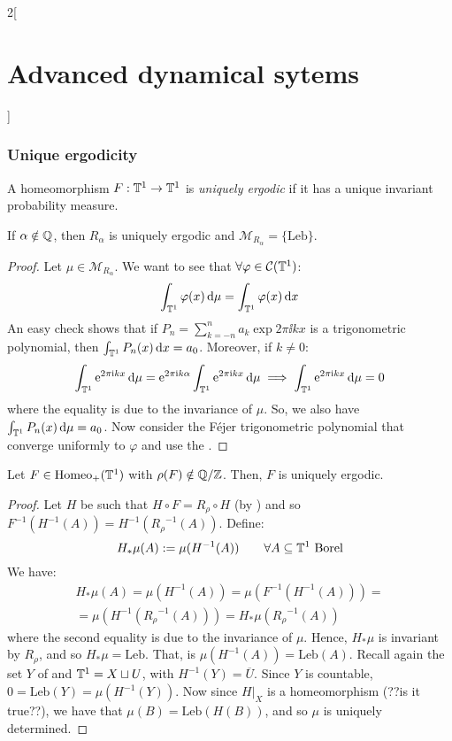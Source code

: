 \documentclass[../../../main_math.tex]{subfiles}
\begin{document}
\begin{multicols}{2}[\section{Advanced dynamical sytems}]
  \subsubsection{Unique ergodicity}
  \begin{definition}
    A homeomorphism $F:\mathbb{T}^1\to\mathbb{T}^1$ is \emph{uniquely ergodic} if it has a unique invariant probability measure.
  \end{definition}
  \begin{lemma}
    If $\alpha\notin \mathbb{Q}$, then $R_\alpha$ is uniquely ergodic and $\mathcal{M}_{R_\alpha}=\{\text{Leb}\}$.
  \end{lemma}
  \begin{proof}
    Let $\mu\in\mathcal{M}_{R_\alpha}$. We want to see that $\forall \varphi\in \mathcal{C}(\mathbb{T}^1)$:
    $$
      \int_{\mathbb{T}^1}\varphi(x)\dd{\mu}=\int_{\mathbb{T}^1}\varphi(x)\dd{x}
    $$
    An easy check shows that if $P_n=\sum_{k=-n}^na_k\exp{2\pi\ii k x}$ is a trigonometric polynomial, then $\int_{\mathbb{T}^1}P_n(x)\dd{x}=a_0$. Moreover, if $k\ne 0$:
    $$
      \int_{\mathbb{T}^1}\mathrm{e}^{2\pi\mathrm{i} kx}\dd{\mu}=\mathrm{e}^{2\pi\mathrm{i} k\alpha}\int_{\mathbb{T}^1}\mathrm{e}^{2\pi\mathrm{i} kx}\dd{\mu}\implies \int_{\mathbb{T}^1}\mathrm{e}^{2\pi\mathrm{i} kx}\dd{\mu}=0
    $$
    where the equality is due to the invariance of $\mu$. So, we also have $\int_{\mathbb{T}^1}P_n(x)\dd{\mu}=a_0$. Now consider the Féjer trigonometric polynomial that converge uniformly to $\varphi$ and use the .
  \end{proof}
  \begin{proposition}\label{ADS:uniquely_ergodic}
    Let $F\in\mathrm{Homeo}_+(\mathbb{T}^1)$ with $\rho(F)\notin\quot{\QQ}{\ZZ}$. Then, $F$ is uniquely ergodic.
  \end{proposition}
  \begin{proof}
    Let $H$ be such that $H\circ F=R_\rho\circ H$ (by ) and so $F^{-1}(H^{-1}(A))=H^{-1}({R_\rho}^{-1}(A))$. Define:
    $$
      H_*\mu(A):=\mu(H^{-1}(A))\qquad \forall A\subseteq \mathbb{T}^1\text{ Borel}
    $$
    We have:
    \begin{multline*}
      H_*\mu(A)=\mu(H^{-1}(A))=\mu(F^{-1}(H^{-1}(A)))=\\=\mu(H^{-1}({R_\rho}^{-1}(A)))=H_*\mu({R_\rho}^{-1}(A))
    \end{multline*}
    where the second equality is due to the invariance of $\mu$. Hence, $H_*\mu$ is invariant by $R_\rho$, and so $H_*\mu=\text{Leb}$. That, is $\mu(H^{-1}(A))=\text{Leb}(A)$. Recall again the set $Y$ of  and $\mathbb{T}^1=X\sqcup U$, with $H^{-1}(Y)=\overline{U}$. Since $Y$ is countable, $0=\text{Leb}(Y)=\mu(H^{-1}(Y))$. Now since $H|_X$ is a homeomorphism (??is it true??), we have that $\mu(B)=\text{Leb}(H(B))$, and so $\mu$ is uniquely determined.

\end{proof}
\end{multicols}
\end{document}
